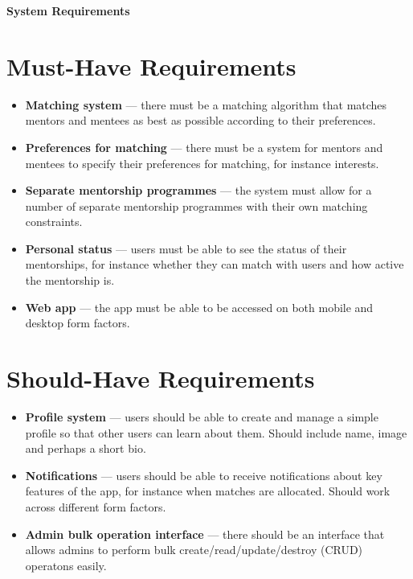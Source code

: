 \documentclass[11pt]{report}
\begin{document}
    \centerline{\LARGE \bf System Requirements}

    \section*{Must-Have Requirements}
    \begin{itemize}
        \item \textbf{Matching system} --- there must be a matching algorithm that matches mentors and mentees as best as possible according to their preferences.
        \item \textbf{Preferences for matching} --- there must be a system for mentors and mentees to specify their preferences for matching, for instance interests.
        \item \textbf{Separate mentorship programmes} --- the system must allow for a number of separate mentorship programmes with their own matching constraints.
        \item \textbf{Personal status} --- users must be able to see the status of their mentorships, for instance whether they can match with users and how active the mentorship is.
        \item \textbf{Web app} --- the app must be able to be accessed on both mobile and desktop form factors.
    \end{itemize}

    \section*{Should-Have Requirements}
    \begin{itemize}
        \item \textbf{Profile system} --- users should be able to create and manage a simple profile so that other users can learn about them. Should include name, image and perhaps a short bio.
        \item \textbf{Notifications} ---  users should be able to receive notifications about key features of the app, for instance when matches are allocated. Should work across different form factors.
        \item \textbf{Admin bulk operation interface} --- there should be an interface that allows admins to perform bulk create/read/update/destroy (CRUD) operatons easily.
    \end{itemize}
\end{document}

